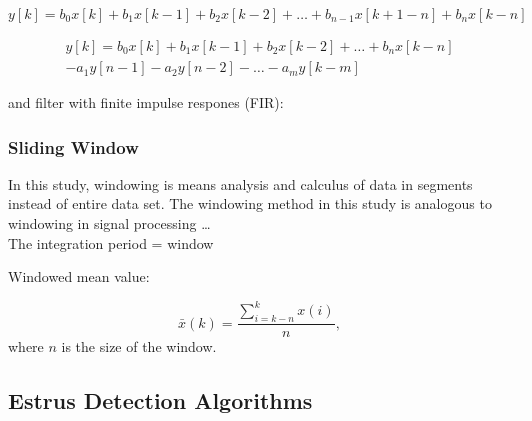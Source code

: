 \documentclass[english,12pt,a4paper,pdftex,elec,utf8]{aaltothesis}
\begin{document}


\begin{equation}
y[k] = b_0 x[k] + b_1 x[k-1] + b_2 x[k-2] + \dots + b_{n-1} x[k+1-n] + b_n x[k-n]
\end{equation}\label{firequation}



\begin{equation}
\begin{aligned}
y[k] = b_0 x[k] + b_1 x[k-1] + b_2 x[k-2] + \dots + b_n x[k-n] \\
-a_1 y[n-1] - a_2 y[n-2] - \dots - a_m y[k-m]
\end{aligned}
\end{equation}\label{iirequation}


and filter with finite impulse respones (FIR):






\subsubsection{Sliding Window} \label{slidingwindowsection}

In this study, windowing is means analysis and calculus of data in segments instead of entire data set. The windowing method in this study is analogous to windowing in signal processing \cite{tan2007digital,miao2007signal} \dots \\

The integration period = window

Windowed mean value:

\begin{equation}
\bar{x}(k) = \frac{ \sum\limits^{k}_{i = k - n} x(i)}{n} \mathrm{,}
\end{equation} where $n$ is the size of the window.


\subsection{Estrus Detection Algorithms} \label{estrusdetectionalgorithmssection}
\end{document}
